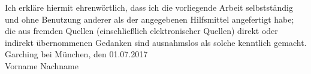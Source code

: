 \cleardoublepage
%

Ich erkläre hiermit ehrenwörtlich, dass ich die vorliegende Arbeit selbstständig und ohne Benutzung anderer als der angegebenen Hilfsmittel angefertigt habe; die aus fremden Quellen (einschließlich elektronischer Quellen) direkt oder indirekt übernommenen Gedanken sind ausnahmslos als solche kenntlich gemacht.
\vspace{1cm}\\
Garching bei München, den 01.07.2017
\vspace{2.5cm}\\
Vorname Nachname